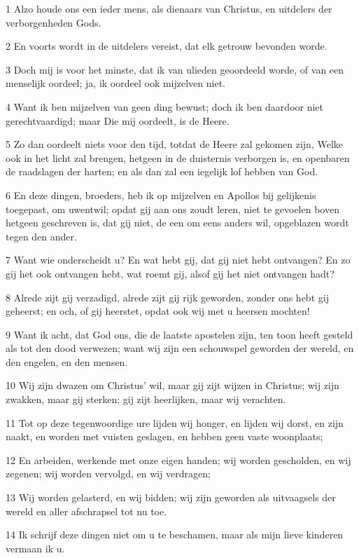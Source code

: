 \par 1 Alzo houde ons een ieder mens, als dienaars van Christus, en uitdelers der verborgenheden Gods.
\par 2 En voorts wordt in de uitdelers vereist, dat elk getrouw bevonden worde.
\par 3 Doch mij is voor het minste, dat ik van ulieden geoordeeld worde, of van een menselijk oordeel; ja, ik oordeel ook mijzelven niet.
\par 4 Want ik ben mijzelven van geen ding bewust; doch ik ben daardoor niet gerechtvaardigd; maar Die mij oordeelt, is de Heere.
\par 5 Zo dan oordeelt niets voor den tijd, totdat de Heere zal gekomen zijn, Welke ook in het licht zal brengen, hetgeen in de duisternis verborgen is, en openbaren de raadslagen der harten; en als dan zal een iegelijk lof hebben van God.
\par 6 En deze dingen, broeders, heb ik op mijzelven en Apollos bij gelijkenis toegepast, om uwentwil; opdat gij aan ons zoudt leren, niet te gevoelen boven hetgeen geschreven is, dat gij niet, de een om eens anders wil, opgeblazen wordt tegen den ander.
\par 7 Want wie onderscheidt u? En wat hebt gij, dat gij niet hebt ontvangen? En zo gij het ook ontvangen hebt, wat roemt gij, alsof gij het niet ontvangen hadt?
\par 8 Alrede zijt gij verzadigd, alrede zijt gij rijk geworden, zonder ons hebt gij geheerst; en och, of gij heerstet, opdat ook wij met u heersen mochten!
\par 9 Want ik acht, dat God ons, die de laatste apostelen zijn, ten toon heeft gesteld als tot den dood verwezen; want wij zijn een schouwspel geworden der wereld, en den engelen, en den mensen.
\par 10 Wij zijn dwazen om Christus' wil, maar gij zijt wijzen in Christus; wij zijn zwakken, maar gij sterken; gij zijt heerlijken, maar wij verachten.
\par 11 Tot op deze tegenwoordige ure lijden wij honger, en lijden wij dorst, en zijn naakt, en worden met vuisten geslagen, en hebben geen vaste woonplaats;
\par 12 En arbeiden, werkende met onze eigen handen; wij worden gescholden, en wij zegenen; wij worden vervolgd, en wij verdragen;
\par 13 Wij worden gelasterd, en wij bidden; wij zijn geworden als uitvaagsels der wereld en aller afschrapsel tot nu toe.
\par 14 Ik schrijf deze dingen niet om u te beschamen, maar als mijn lieve kinderen vermaan ik u.
